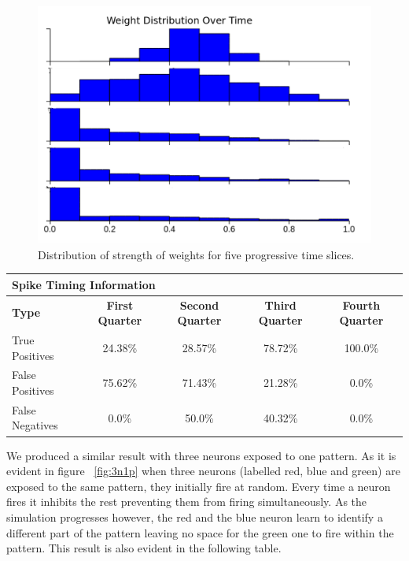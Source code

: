 \documentclass[a4paper,11pt]{article}
\begin{document}
\begin{figure}[H]
\centering
\includegraphics[scale = 0.35]{pr2}
\caption{Distribution of strength of weights for five progressive time slices.}
\end{figure}




\begin{table}[H]
\centering
\begin{tabular}{lllll}
\multicolumn{4}{l}{\textbf{Spike Timing Information}}\\
\hline
\multicolumn{1}{l}{\textbf{Type}} & \multicolumn{1}{c}{\textbf{First Quarter}} & \multicolumn{1}{c}{\textbf{Second Quarter}} & \multicolumn{1}{c}{\textbf{Third Quarter}} & \multicolumn{1}{c}{\textbf{Fourth Quarter}} \\ \hline
\multicolumn{1}{l}{True Positives} & \multicolumn{1}{c}{24.38\%} & \multicolumn{1}{c}{28.57\%} & \multicolumn{1}{c}{78.72\%} & \multicolumn{1}{c}{100.0\%} \\ \hline
\multicolumn{1}{l}{False Positives} & \multicolumn{1}{c}{75.62\%} & \multicolumn{1}{c}{71.43\%} & \multicolumn{1}{c}{21.28\%} & \multicolumn{1}{c}{0.0\%} \\ \hline
\multicolumn{1}{l}{False Negatives} & \multicolumn{1}{c}{0.0\%} & \multicolumn{1}{c}{50.0\%} & \multicolumn{1}{c}{40.32\%} & \multicolumn{1}{c}{0.0\%} \\ \hline
\end{tabular}
\end{table}


We produced a similar result with three neurons exposed to one pattern. As it is evident in figure ~\ref{fig:3n1p} when three neurons (labelled red, blue and green) are exposed to the same pattern, they initially fire at random. Every time a neuron fires it inhibits the rest preventing them from firing simultaneously. As the simulation progresses however, the red and the blue neuron learn to identify a different part of the pattern leaving no space for the green one to fire within the pattern. This result is also evident in the following table.
\end{document}
